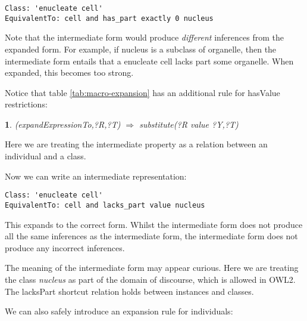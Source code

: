 \documentclass{llncs}
\newtheorem{exprule}{}[section]
\begin{document}
\begin{verbatim}
Class: 'enucleate cell'
EquivalentTo: cell and has_part exactly 0 nucleus
\end{verbatim}


Note that the intermediate form would produce \emph{different}
inferences from the expanded form. For example, if nucleus is a
subclass of organelle, then the intermediate form entails that a
enucleate cell lacks part some organelle. When expanded, this becomes
too strong.

Notice that table \ref{tab:macro-expansion} has an additional rule for
hasValue restrictions:

\begin{exprule}\label{exp-some}
(expandExpressionTo,?R,?T)  $\Rightarrow$ \newline
substitute(?R value ?Y,?T)
\end{exprule}

Here we are treating the intermediate property as a relation between
an individual and a class.

Now we can write an intermediate representation:

\begin{verbatim}
Class: 'enucleate cell'
EquivalentTo: cell and lacks_part value nucleus
\end{verbatim}


This expands to the correct form. Whilst the intermediate form does
not produce all the same inferences as the intermediate form, the
intermediate form does not produce any incorrect inferences.


The meaning of the intermediate form may appear curious.  Here we are
treating the class \emph{nucleus} as part of the domain of discourse,
which is allowed in OWL2. The lacksPart shortcut relation holds between
instances  and classes.

We can also safely introduce an expansion rule for individuals:
\end{document}
